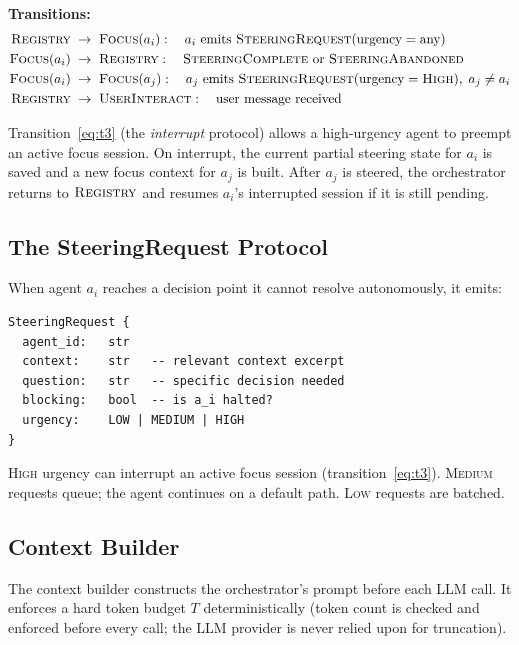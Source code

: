 \documentclass{article}
\begin{document}
\noindent\textbf{Transitions:}
\begin{align}
  \textsc{Registry} &\;\to\; \textsc{Focus}(a_i): \quad
    a_i \text{ emits } \textsc{SteeringRequest}(\text{urgency} = \text{any}) \label{eq:t1}\\
  \textsc{Focus}(a_i) &\;\to\; \textsc{Registry}: \quad
    \textsc{SteeringComplete} \text{ or } \textsc{SteeringAbandoned} \label{eq:t2}\\
  \textsc{Focus}(a_i) &\;\to\; \textsc{Focus}(a_j): \quad
    a_j \text{ emits } \textsc{SteeringRequest}(\text{urgency} = \textsc{High}), \; a_j \neq a_i \label{eq:t3}\\
  \textsc{Registry} &\;\to\; \textsc{UserInteract}: \quad
    \text{user message received} \label{eq:t4}
\end{align}

Transition~\eqref{eq:t3} (the \emph{interrupt} protocol) allows a
high-urgency agent to preempt an active focus session.
On interrupt, the current partial steering state for $a_i$ is saved and
a new focus context for $a_j$ is built.
After $a_j$ is steered, the orchestrator returns to $\textsc{Registry}$
and resumes $a_i$'s interrupted session if it is still pending.

\subsection{The SteeringRequest Protocol}
\label{sec:protocol}

When agent $a_i$ reaches a decision point it cannot resolve autonomously,
it emits:

\begin{lstlisting}
SteeringRequest {
  agent_id:   str
  context:    str   -- relevant context excerpt
  question:   str   -- specific decision needed
  blocking:   bool  -- is a_i halted?
  urgency:    LOW | MEDIUM | HIGH
}
\end{lstlisting}

\textsc{High} urgency can interrupt an active focus session
(transition~\eqref{eq:t3}).
\textsc{Medium} requests queue; the agent continues on a default path.
\textsc{Low} requests are batched.

\subsection{Context Builder}
\label{sec:context_builder}

The context builder constructs the orchestrator's prompt before each LLM
call.
It enforces a hard token budget $T$ deterministically (token count is
checked and enforced before every call; the LLM provider is never relied
upon for truncation).
\end{document}

